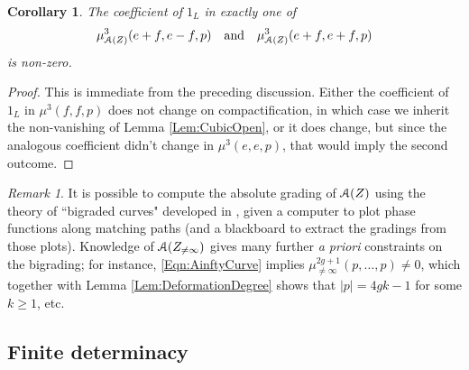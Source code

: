 \documentclass[reqno,10pt]{amsart}
\numberwithin{equation}{section}
\newcommand{\scrA}{\EuScript{A}}
\newtheorem{Corollary}[thm]{Corollary}
\theoremstyle{remark}
\newtheorem{Remark}[thm]{Remark}
\begin{document}
\begin{Corollary} \label{Cor:CubicClosed}
The coefficient of $1_L$ in exactly one of  
\[
\mu^3_{\scrA(Z)}(e+f, e-f, p) \quad \textrm{and} \quad \mu^3_{\scrA(Z)}(e+f,e+f,p)
\]
 is non-zero.
\end{Corollary}

\begin{proof}
This is immediate from the preceding discussion. Either the coefficient of $1_L$ in $\mu^3(f,f,p)$ does not change on compactification, in which case we inherit the non-vanishing of Lemma \ref{Lem:CubicOpen}, or it does change, but since the analogous coefficient didn't change in $\mu^3(e,e,p)$, that would imply the second outcome. 
\end{proof}



\begin{Remark} It is possible to compute the absolute grading of $\scrA(Z)$ using the theory of ``bigraded curves" developed in \cite{KhovanovSeidel}, given a computer to plot phase functions along matching paths (and a blackboard to extract the gradings from those plots).  Knowledge of $\scrA(Z_{\neq\infty})$ gives many further \emph{a priori} constraints on the bigrading; for instance, \eqref{Eqn:AinftyCurve} implies $\mu^{2g+1}_{\neq\infty}(p,\ldots,p) \neq 0$, which together with Lemma \ref{Lem:DeformationDegree} shows that $|p| = 4gk-1$ for some $k\geq 1$, etc.
\end{Remark} 





\subsection{Finite determinacy\label{Section:FiniteDeterminacy}}
\end{document}
